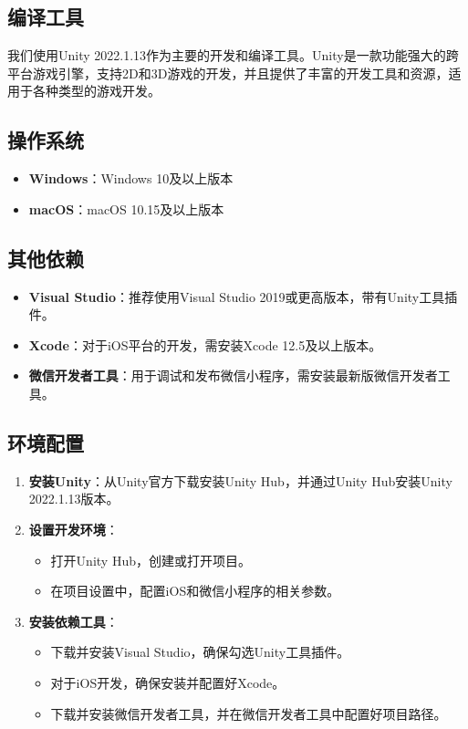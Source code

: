 \documentclass{mancls}%
\begin{document}
\subsection{编译工具}

我们使用Unity 2022.1.13作为主要的开发和编译工具。Unity是一款功能强大的跨平台游戏引擎，支持2D和3D游戏的开发，并且提供了丰富的开发工具和资源，适用于各种类型的游戏开发。

\subsection{操作系统}

\begin{itemize}
  \item \textbf{Windows}：Windows 10及以上版本
  \item \textbf{macOS}：macOS 10.15及以上版本
\end{itemize}

\subsection{其他依赖}

\begin{itemize}
  \item \textbf{Visual Studio}：推荐使用Visual Studio 2019或更高版本，带有Unity工具插件。
  \item \textbf{Xcode}：对于iOS平台的开发，需安装Xcode 12.5及以上版本。
  \item \textbf{微信开发者工具}：用于调试和发布微信小程序，需安装最新版微信开发者工具。
\end{itemize}

\subsection{环境配置}

\begin{enumerate}
  \item \textbf{安装Unity}：从Unity官方下载安装Unity Hub，并通过Unity Hub安装Unity 2022.1.13版本。
  \item \textbf{设置开发环境}：
        \begin{itemize}
          \item 打开Unity Hub，创建或打开项目。
          \item 在项目设置中，配置iOS和微信小程序的相关参数。
        \end{itemize}
  \item \textbf{安装依赖工具}：
        \begin{itemize}
          \item 下载并安装Visual Studio，确保勾选Unity工具插件。
          \item 对于iOS开发，确保安装并配置好Xcode。
          \item 下载并安装微信开发者工具，并在微信开发者工具中配置好项目路径。
        \end{itemize}
\end{enumerate}
\end{document}
